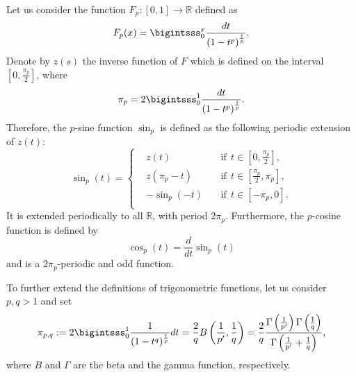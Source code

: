 \documentclass{amsart}
\theoremstyle{definition}
\theoremstyle{remark}
\newcommand{\R}{\mathbb{R}}
\begin{document}
Let us consider the function $F_p:[0, 1]\to\R$ defined as
\begin{equation*}
F_p(x)=\bigintsss_0^x\frac{dt}{\left(1-{t^p}\right)^\frac 1p}.
\end{equation*}
Denote by $z(s)$ the inverse function of $F$ which is defined on the interval $\left[0,\frac{\pi_p}{2}\right]$, where
\[
\pi_p=2\bigintsss_{ 0}^{1}\frac{dt}{\left(1-{t^p}\right)^\frac 1p}.\]
Therefore, the $p$-sine function $\sin_p$ is defined as the following periodic extension of $z(t)$:
\[
\sin_p(t)=\left\{ \begin{split}
& z(t) &&\text{if}\ \ t\in\left[0,\frac{\pi_p}{2}\right],\\
& z(\pi_p-t) &&\text{if}\ \ t\in\left[\frac{\pi_p}{2}, \pi_p\right], \\
& -\sin_p(-t)\  &&\text{if}\ \ t\in\left[-\pi_p, 0\right]. \\
\end{split}
\right.
\]
It is extended periodically to all $\R$, with period $2\pi_p$. Furthermore, the $p$-cosine function is defined by
\[
\cos_p( t) =\frac{d}{dt}\sin_p \left( t\right)
\]
and is a $2 \pi_p$-periodic and odd function.


To further extend the definitions of trigonometric functions, let us consider $p,q>1$ and set 
\[
\pi_{p,q}:=2\bigintsss_{0}^1\frac 1 {(1-t^q)^\frac1p}dt=\frac 2 q B\left(\frac 1 {p'},\frac 1 q\right)=\frac 2 q \frac{\Gamma \left(\frac 1 {p'}\right)\Gamma \left(\frac 1q \right)}{\Gamma \left(\frac 1{p'}+\frac 1 q\right)},
\]
where $B$ and $\Gamma$ are the beta and the gamma function, respectively.
\end{document}
